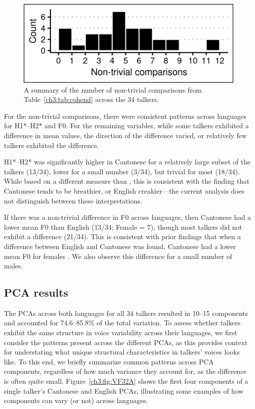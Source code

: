 \begin{figure}[htbp]
\begin{center}
\includegraphics[width=0.875\linewidth]{figures/3-non-trivial_counts_by_talker.png} 
\caption{A summary of the number of non-trivial comparisons from Table~\ref{ch3:tab:cohend} across the 34 talkers.}
\label{ch3:fig:ntcounts}
\end{center}
\end{figure}

For the non-trivial comparisons, there were consistent patterns across languages for H1*--H2* and F0. For the remaining variables, while some talkers exhibited a difference in mean values, the direction of the difference varied, or relatively few talkers exhibited the difference. 

H1*--H2* was significantly higher in Cantonese for a relatively large subset of the talkers (13/34), lower for a small number (3/34), but trivial for most (18/34). While based on a different measure than \citep{ng_2012_ltas}, this is consistent with the finding that Cantonese tends to be breathier, or English creakier---the current analysis does not distinguish between these interpretations.

If there was a non-trivial difference in F0 across languages, then Cantonese had a lower mean F0 than English (13/34; Female = 7), though most talkers did not exhibit a difference (21/34). This is consistent with prior findings that when a difference between English and Cantonese was found, Cantonese had a lower mean F0 for females \citep{ng_2012_ltas,altenberg_2006_f0}. We also observe this difference for a small number of males. 

\subsection{PCA results}\label{ch3:sec:pca_results} 
The PCAs across both languages for all 34 talkers resulted in 10--15 components and accounted for 74.6--85.8\% of the total variation. To assess whether talkers exhibit the same structure in voice variability across their languages, we first consider the patterns present across the different PCAs, as this provides context for understating what unique structural characteristics in talkers' voices looks like. To this end, we briefly summarize common patterns across PCA components, regardless of how much variance they account for, as the difference is often quite small. Figure~\ref{ch3:fig:VF32A} shows the first four components of a single talker's Cantonese and English PCAs, illustrating some examples of how components can vary (or not) across languages. 

